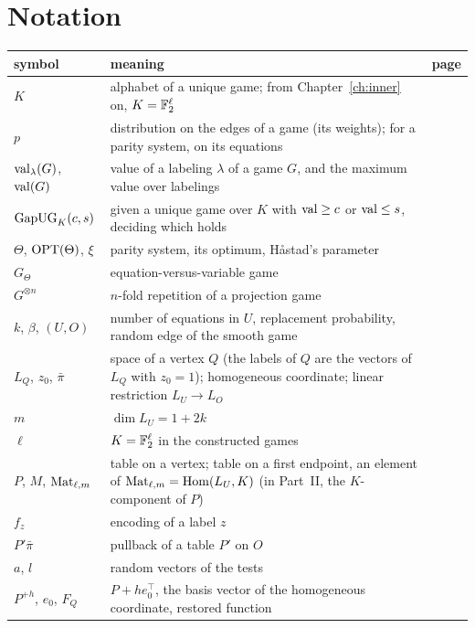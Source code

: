 \chapter{Notation}\label{app:notation}

{\small
\renewcommand{\arraystretch}{1.15}
\begin{longtable}{@{}p{3.4cm}p{10.4cm}r@{}}
symbol & meaning & page\\\hline
\endhead
$K$ & alphabet of a unique game; from Chapter~\ref{ch:inner} on, $K=\mathbb{F}_2^\ell$ & \pageref{def:ug}\\
$p$ & distribution on the edges of a game (its weights); for a parity system, on its equations & \pageref{def:ug}\\
$\operatorname{val}_\lambda(G)$, $\operatorname{val}(G)$ & value of a labeling $\lambda$ of a game $G$, and the maximum value over labelings & \pageref{def:ug}\\
$\mathrm{GapUG}_K(c,s)$ & given a unique game over $K$ with $\operatorname{val}\ge c$ or $\operatorname{val}\le s$, deciding which holds & \pageref{nt:gap}\\
$\Theta$, $\operatorname{OPT}(\Theta)$, $\xi$ & parity system, its optimum, H\aa stad's parameter & \pageref{thm:hastad}\\
$G_\Theta$ & equation-versus-variable game & \pageref{def:evv}\\
$G^{\otimes n}$ & $n$-fold repetition of a projection game & \pageref{def:rep}\\
$k$, $\beta$, $(U,O)$ & number of equations in $U$, replacement probability, random edge of the smooth game & \pageref{def:smooth}\\
$L_Q$, $z_0$, $\bar\pi$ & space of a vertex $Q$ (the labels of $Q$ are the vectors of $L_Q$ with $z_0=1$); homogeneous coordinate; linear restriction $L_U\to L_O$ & \pageref{nt:labels}\\
$m$ & $\dim L_U=1+2k$ & \pageref{nt:labels}\\
$\ell$ & $K=\mathbb{F}_2^\ell$ in the constructed games & \pageref{nt:clouds}\\
$P$, $M$, $\operatorname{Mat}_{\ell,m}$ & table on a vertex; table on a first endpoint, an element of $\operatorname{Mat}_{\ell,m}=\operatorname{Hom}(L_U,K)$ (in Part~II, the $K$-component of $P$) & \pageref{nt:clouds}\\
$f_z$ & encoding of a label $z$ & \pageref{nt:clouds}\\
$P'\bar\pi$ & pullback of a table $P'$ on $O$ & \pageref{nt:shared}\\
$a$, $l$ & random vectors of the tests & \pageref{def:shortcode}\\
$P^{+h}$, $e_0$, $F_Q$ & $P+he_0^\top$, the basis vector of the homogeneous coordinate, restored function & \pageref{nt:folding}\\

\end{longtable}}

